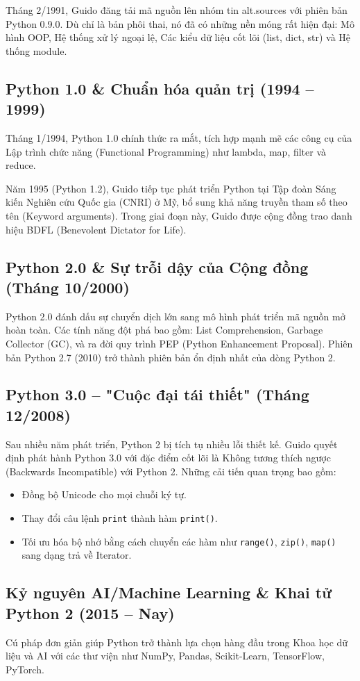 Tháng 2/1991, Guido đăng tải mã nguồn lên nhóm tin alt.sources với phiên bản Python 0.9.0. Dù chỉ là bản phôi thai, nó đã có những nền móng rất hiện đại: Mô hình OOP, Hệ thống xử lý ngoại lệ, Các kiểu dữ liệu cốt lõi (list, dict, str) và Hệ thống module.

\subsection{Python 1.0 \& Chuẩn hóa quản trị (1994 – 1999)}
Tháng 1/1994, Python 1.0 chính thức ra mắt, tích hợp mạnh mẽ các công cụ của Lập trình chức năng (Functional Programming) như lambda, map, filter và reduce.

Năm 1995 (Python 1.2), Guido tiếp tục phát triển Python tại Tập đoàn Sáng kiến Nghiên cứu Quốc gia (CNRI) ở Mỹ, bổ sung khả năng truyền tham số theo tên (Keyword arguments). Trong giai đoạn này, Guido được cộng đồng trao danh hiệu BDFL (Benevolent Dictator for Life).

\subsection{Python 2.0 \& Sự trỗi dậy của Cộng đồng (Tháng 10/2000)}
Python 2.0 đánh dấu sự chuyển dịch lớn sang mô hình phát triển mã nguồn mở hoàn toàn. Các tính năng đột phá bao gồm: List Comprehension, Garbage Collector (GC), và ra đời quy trình PEP (Python Enhancement Proposal). Phiên bản Python 2.7 (2010) trở thành phiên bản ổn định nhất của dòng Python 2.

\subsection{Python 3.0 – "Cuộc đại tái thiết" (Tháng 12/2008)}
Sau nhiều năm phát triển, Python 2 bị tích tụ nhiều lỗi thiết kế. Guido quyết định phát hành Python 3.0 với đặc điểm cốt lõi là Không tương thích ngược (Backwards Incompatible) với Python 2. Những cải tiến quan trọng bao gồm:
\begin{itemize}
    \item Đồng bộ Unicode cho mọi chuỗi ký tự.
    \item Thay đổi câu lệnh \texttt{print} thành hàm \texttt{print()}.
    \item Tối ưu hóa bộ nhớ bằng cách chuyển các hàm như \texttt{range()}, \texttt{zip()}, \texttt{map()} sang dạng trả về Iterator.
\end{itemize}

\subsection{Kỷ nguyên AI/Machine Learning \& Khai tử Python 2 (2015 – Nay)}
Cú pháp đơn giản giúp Python trở thành lựa chọn hàng đầu trong Khoa học dữ liệu và AI với các thư viện như NumPy, Pandas, Scikit-Learn, TensorFlow, PyTorch.

